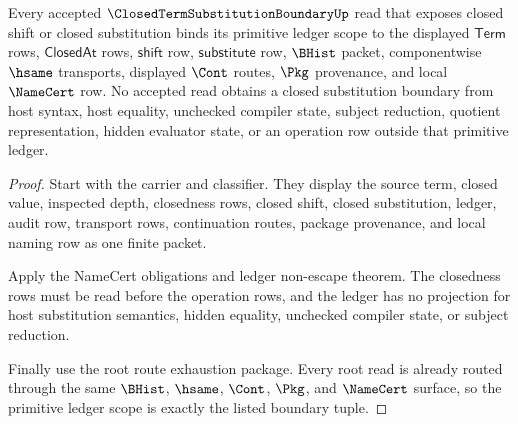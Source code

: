 \begin{theorem}
\label{thm:closed-term-substitution-boundary-primitive-ledger-scope}
Every accepted $\ClosedTermSubstitutionBoundaryUp$ read that exposes closed shift or closed substitution binds its primitive ledger scope to the displayed $\mathsf{Term}$ rows, $\mathsf{ClosedAt}$ rows, $\mathsf{shift}$ row, $\mathsf{substitute}$ row, $\BHist$ packet, componentwise $\hsame$ transports, displayed $\Cont$ routes, $\Pkg$ provenance, and local $\NameCert$ row. No accepted read obtains a closed substitution boundary from host syntax, host equality, unchecked compiler state, subject reduction, quotient representation, hidden evaluator state, or an operation row outside that primitive ledger.
\end{theorem}
\begin{proof}
Start with the carrier and classifier. They display the source term, closed value, inspected depth, closedness rows, closed shift, closed substitution, ledger, audit row, transport rows, continuation routes, package provenance, and local naming row as one finite packet.

Apply the NameCert obligations and ledger non-escape theorem. The closedness rows must be read before the operation rows, and the ledger has no projection for host substitution semantics, hidden equality, unchecked compiler state, or subject reduction.

Finally use the root route exhaustion package. Every root read is already routed through the same $\BHist$, $\hsame$, $\Cont$, $\Pkg$, and $\NameCert$ surface, so the primitive ledger scope is exactly the listed boundary tuple.
\end{proof}

